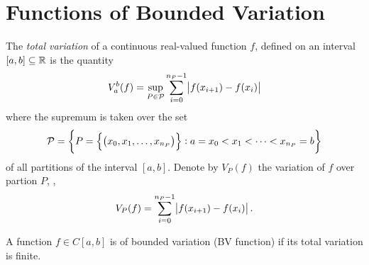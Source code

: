\chapter{Functions of Bounded Variation}
\begin{defn}
The \emph{total variation} of a continuous real-valued function $f$, 
defined on an interval $[a, b] \subseteq \mathbb{R}$ is the quantity 
\begin{equation*}
    V_a^b(f) = \sup_{P \in \mathcal{P}} \sum_{i=0}^{n_P - 1} 
        \abs{f(x_{i+1}) - f(x_i)}
\end{equation*}
where the supremum is taken over the set 
\begin{equation*}
    \mathcal{P} = \left\{ P = \left\{ \left(x_0, x_1, \ldots, x_{n_P} 
        \right)\right\}: a = x_0 < x_1 < \cdots < x_{n_{P}} = b \right\}
\end{equation*}
of all partitions of the interval $[a, b]$. 
Denote by $V_P(f)$ the variation of $f$ over partion $P$, \ie, 
\begin{equation*}
    V_P(f) = \sum_{i=0}^{n_P-1} \abs{f(x_{i+1}) - f(x_i)}. 
\end{equation*}
\end{defn}

\begin{defn}[BV function]
\label{def:bounded_variation_function}
A function $f \in C[a, b]$ is of bounded variation (BV function) if its 
total variation is finite. 
\end{defn}